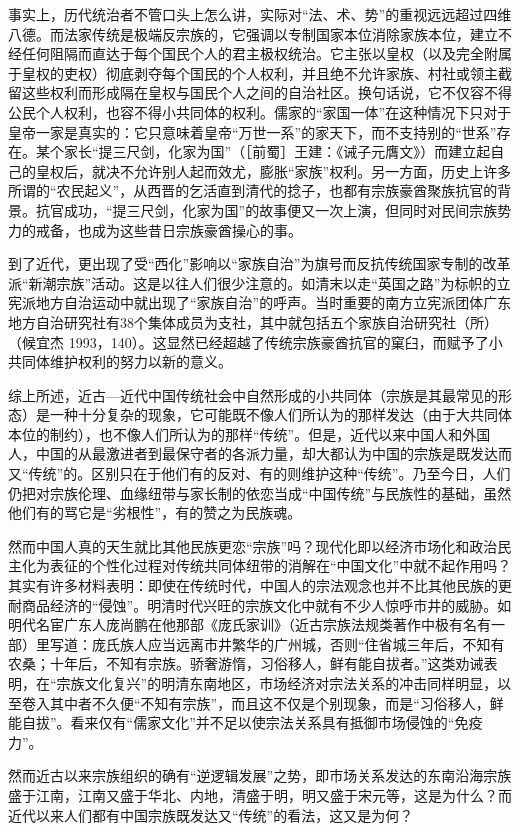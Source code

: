 \documentclass[a4paper,12pt,punct=kaiming]{ctexart}
\begin{document}
事实上，历代统治者不管口头上怎么讲，实际对“法、术、势”的重视远远超过四维八德。而法家传统是极端反宗族的，它强调以专制国家本位消除家族本位，建立不经任何阻隔而直达于每个国民个人的君主极权统治。它主张以皇权（以及完全附属于皇权的吏权）彻底剥夺每个国民的个人权利，并且绝不允许家族、村社或领主截留这些权利而形成隔在皇权与国民个人之间的自治社区。换句话说，它不仅容不得公民个人权利，也容不得小共同体的权利。儒家的“家国一体”在这种情况下只对于皇帝一家是真实的：它只意味着皇帝“万世一系”的家天下，而不支持别的“世系”存在。某个家长“提三尺剑，化家为国”（［前蜀］王建：《诫子元膺文》）而建立起自己的皇权后，就决不允许别人起而效尤，膨胀“家族”权利。另一方面，历史上许多所谓的“农民起义”，从西晋的乞活直到清代的捻子，也都有宗族豪酋聚族抗官的背景。抗官成功，“提三尺剑，化家为国”的故事便又一次上演，但同时对民间宗族势力的戒备，也成为这些昔日宗族豪酋操心的事。

到了近代，更出现了受“西化”影响以“家族自治”为旗号而反抗传统国家专制的改革派“新潮宗族”活动。这是以往人们很少注意的。如清末以走“英国之路”为标帜的立宪派地方自治运动中就出现了“家族自治”的呼声。当时重要的南方立宪派团体广东地方自治研究社有38个集体成员为支社，其中就包括五个家族自治研究社（所）（候宜杰 1993，140）。这显然已经超越了传统宗族豪酋抗官的窠臼，而赋予了小共同体维护权利的努力以新的意义。

综上所述，近古—近代中国传统社会中自然形成的小共同体（宗族是其最常见的形态）是一种十分复杂的现象，它可能既不像人们所认为的那样发达（由于大共同体本位的制约），也不像人们所认为的那样“传统”。但是，近代以来中国人和外国人，中国的从最激进者到最保守者的各派力量，却大都认为中国的宗族是既发达而又“传统”的。区别只在于他们有的反对、有的则维护这种“传统”。乃至今日，人们仍把对宗族伦理、血缘纽带与家长制的依恋当成“中国传统”与民族性的基础，虽然他们有的骂它是“劣根性”，有的赞之为民族魂。

然而中国人真的天生就比其他民族更恋“宗族”吗？现代化即以经济市场化和政治民主化为表征的个性化过程对传统共同体纽带的消解在“中国文化”中就不起作用吗？其实有许多材料表明：即使在传统时代，中国人的宗法观念也并不比其他民族的更耐商品经济的“侵蚀”。明清时代兴旺的宗族文化中就有不少人惊呼市井的威胁。如明代名宦广东人庞尚鹏在他那部《庞氏家训》（近古宗族法规类著作中极有名有一部）里写道：庞氏族人应当远离市井繁华的广州城，否则“住省城三年后，不知有农桑；十年后，不知有宗族。骄奢游惰，习俗移人，鲜有能自拔者。”这类劝诫表明，在“宗族文化复兴”的明清东南地区，市场经济对宗法关系的冲击同样明显，以至卷入其中者不久便“不知有宗族”，而且这不仅是个别现象，而是“习俗移人，鲜能自拔”。看来仅有“儒家文化”并不足以使宗法关系具有抵御市场侵蚀的“免疫力”。

然而近古以来宗族组织的确有“逆逻辑发展”之势，即市场关系发达的东南沿海宗族盛于江南，江南又盛于华北、内地，清盛于明，明又盛于宋元等，这是为什么？而近代以来人们都有中国宗族既发达又“传统”的看法，这又是为何？
\end{document}
